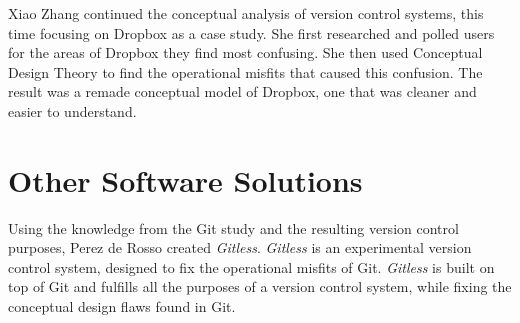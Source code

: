 Xiao Zhang continued the conceptual analysis of version control systems, this time focusing on Dropbox as a case study. She first researched and polled users for the areas of Dropbox they find most confusing. She then used Conceptual Design Theory to find the operational misfits that caused this confusion. The result was a remade conceptual model of Dropbox, one that was cleaner and easier to understand.

\section{Other Software Solutions}

Using the knowledge from the Git study and the resulting version control purposes, Perez de Rosso created \textit{Gitless}. \textit{Gitless} is an experimental version control system, designed to fix the operational misfits of Git. \textit{Gitless} is built on top of Git and fulfills all the purposes of a version control system, while fixing the conceptual design flaws found in Git. 